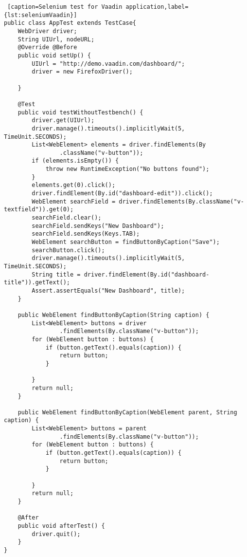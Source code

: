  	
  	\lstset{style=a1listing}
  	\begin{lstlisting} [caption=Selenium test for Vaadin application,label={lst:seleniumVaadin}]
public class AppTest extends TestCase{
	WebDriver driver;
    String UIUrl, nodeURL;	
	@Override @Before
    public void setUp() {
        UIUrl = "http://demo.vaadin.com/dashboard/";
        driver = new FirefoxDriver();

    }

    @Test
    public void testWithoutTestbench() {
        driver.get(UIUrl);
        driver.manage().timeouts().implicitlyWait(5, TimeUnit.SECONDS);
        List<WebElement> elements = driver.findElements(By
                .className("v-button"));
        if (elements.isEmpty()) {
            throw new RuntimeException("No buttons found");
        }
        elements.get(0).click();
        driver.findElement(By.id("dashboard-edit")).click();
        WebElement searchField = driver.findElements(By.className("v-textfield")).get(0);
        searchField.clear();
        searchField.sendKeys("New Dashboard");
        searchField.sendKeys(Keys.TAB);
        WebElement searchButton = findButtonByCaption("Save");
        searchButton.click();
        driver.manage().timeouts().implicitlyWait(5, TimeUnit.SECONDS);
        String title = driver.findElement(By.id("dashboard-title")).getText();
        Assert.assertEquals("New Dashboard", title);
    }

    public WebElement findButtonByCaption(String caption) {
        List<WebElement> buttons = driver
                .findElements(By.className("v-button"));
        for (WebElement button : buttons) {
            if (button.getText().equals(caption)) {
                return button;
            }

        }
        return null;
    }

    public WebElement findButtonByCaption(WebElement parent, String caption) {
        List<WebElement> buttons = parent
                .findElements(By.className("v-button"));
        for (WebElement button : buttons) {
            if (button.getText().equals(caption)) {
                return button;
            }

        }
        return null;
    }

    @After
    public void afterTest() {
        driver.quit();
    }
}
\end{lstlisting}


